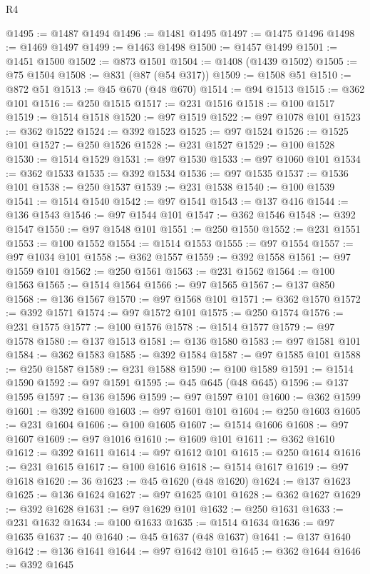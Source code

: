 \begin{lexlean}{R4}
\begin{coremodule}
@1495 := @1487 @1494
@1496 := @1481 @1495
@1497 := @1475 @1496
@1498 := @1469 @1497
@1499 := @1463 @1498
@1500 := @1457 @1499
@1501 := @1451 @1500
@1502 := @873 @1501
@1504 := @1408 (@1439 @1502)
@1505 := @75 @1504
@1508 := @831 (@87 (@54 @317))
@1509 := @1508 @51
@1510 := @872 @51
@1513 := @45 @670 (@48 @670)
@1514 := @94 @1513
@1515 := @362 @101
@1516 := @250 @1515
@1517 := @231 @1516
@1518 := @100 @1517
@1519 := @1514 @1518
@1520 := @97 @1519
@1522 := @97 @1078 @101
@1523 := @362 @1522
@1524 := @392 @1523
@1525 := @97 @1524
@1526 := @1525 @101
@1527 := @250 @1526
@1528 := @231 @1527
@1529 := @100 @1528
@1530 := @1514 @1529
@1531 := @97 @1530
@1533 := @97 @1060 @101
@1534 := @362 @1533
@1535 := @392 @1534
@1536 := @97 @1535
@1537 := @1536 @101
@1538 := @250 @1537
@1539 := @231 @1538
@1540 := @100 @1539
@1541 := @1514 @1540
@1542 := @97 @1541
@1543 := @137 @416
@1544 := @136 @1543
@1546 := @97 @1544 @101
@1547 := @362 @1546
@1548 := @392 @1547
@1550 := @97 @1548 @101
@1551 := @250 @1550
@1552 := @231 @1551
@1553 := @100 @1552
@1554 := @1514 @1553
@1555 := @97 @1554
@1557 := @97 @1034 @101
@1558 := @362 @1557
@1559 := @392 @1558
@1561 := @97 @1559 @101
@1562 := @250 @1561
@1563 := @231 @1562
@1564 := @100 @1563
@1565 := @1514 @1564
@1566 := @97 @1565
@1567 := @137 @850
@1568 := @136 @1567
@1570 := @97 @1568 @101
@1571 := @362 @1570
@1572 := @392 @1571
@1574 := @97 @1572 @101
@1575 := @250 @1574
@1576 := @231 @1575
@1577 := @100 @1576
@1578 := @1514 @1577
@1579 := @97 @1578
@1580 := @137 @1513
@1581 := @136 @1580
@1583 := @97 @1581 @101
@1584 := @362 @1583
@1585 := @392 @1584
@1587 := @97 @1585 @101
@1588 := @250 @1587
@1589 := @231 @1588
@1590 := @100 @1589
@1591 := @1514 @1590
@1592 := @97 @1591
@1595 := @45 @645 (@48 @645)
@1596 := @137 @1595
@1597 := @136 @1596
@1599 := @97 @1597 @101
@1600 := @362 @1599
@1601 := @392 @1600
@1603 := @97 @1601 @101
@1604 := @250 @1603
@1605 := @231 @1604
@1606 := @100 @1605
@1607 := @1514 @1606
@1608 := @97 @1607
@1609 := @97 @1016
@1610 := @1609 @101
@1611 := @362 @1610
@1612 := @392 @1611
@1614 := @97 @1612 @101
@1615 := @250 @1614
@1616 := @231 @1615
@1617 := @100 @1616
@1618 := @1514 @1617
@1619 := @97 @1618
@1620 := 36
@1623 := @45 @1620 (@48 @1620)
@1624 := @137 @1623
@1625 := @136 @1624
@1627 := @97 @1625 @101
@1628 := @362 @1627
@1629 := @392 @1628
@1631 := @97 @1629 @101
@1632 := @250 @1631
@1633 := @231 @1632
@1634 := @100 @1633
@1635 := @1514 @1634
@1636 := @97 @1635
@1637 := 40
@1640 := @45 @1637 (@48 @1637)
@1641 := @137 @1640
@1642 := @136 @1641
@1644 := @97 @1642 @101
@1645 := @362 @1644
@1646 := @392 @1645

\end{coremodule}
\end{lexlean}
